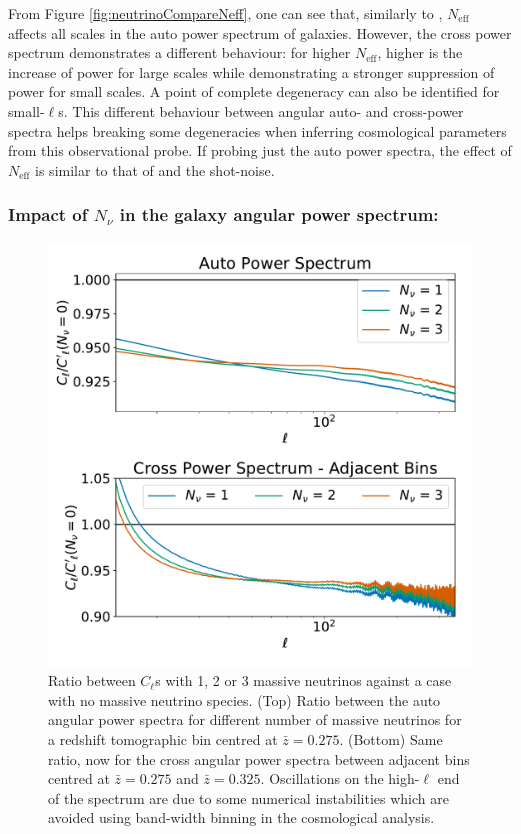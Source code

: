 \qquad From Figure \ref{fig:neutrinoCompareNeff}, one can see that, similarly to \NM, $N_{\text{eff}}$ affects all scales in the auto power spectrum of galaxies. However, the cross power spectrum demonstrates a different behaviour: for higher $N_{\text{eff}}$, higher is the increase of power for large scales while demonstrating a stronger suppression of power for small scales. A point of complete degeneracy can also be identified for small-$\ell$s. This different behaviour between angular auto- and cross-power spectra helps breaking some degeneracies when inferring cosmological parameters from this observational probe. If probing just the auto power spectra, the effect of $N_{\text{eff}}$ is similar to that of \NM{} and the shot-noise.

\subsubsection{Impact of $N_{\nu}$ in the galaxy angular power spectrum:}
\begin{figure}
\begin{center}
\includegraphics[scale=0.50]{Neutrino-FIGS/Neutrinos_Nnu.pdf}
\caption[Impact of the number massive neutrinos in the angular power spectra of galaxies.]{Ratio between $C_{\ell}$s with 1, 2 or 3 massive neutrinos against a case with no massive neutrino species. (Top) Ratio between the auto angular power spectra for different number of massive neutrinos for a redshift tomographic bin centred at $\bar{z} = 0.275$. (Bottom) Same ratio, now for the cross angular power spectra between adjacent bins centred at $\bar{z} = 0.275$ and $\bar{z} = 0.325$. Oscillations on the high-$\ell$ end of the spectrum are due to some numerical instabilities which are avoided using band-width binning in the cosmological analysis.}
\label{fig:neutrinoCompareNnu}
\end{center}
\end{figure}

